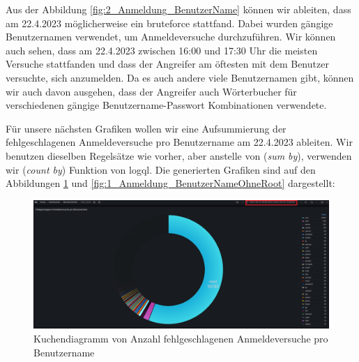 Aus der Abbildung \ref{fig:2_Anmeldung_BenutzerName} können wir ableiten, dass am 22.4.2023 möglicherweise ein \gls{bruteforce} stattfand. Dabei wurden gängige Benutzernamen verwendet, um Anmeldeversuche durchzuführen. Wir können auch sehen, dass am 22.4.2023 zwischen 16:00 und 17:30 Uhr die meisten Versuche stattfanden und dass der Angreifer am öftesten mit dem Benutzer  versuchte, sich anzumelden. Da es auch andere viele Benutzernamen gibt, können wir auch davon ausgehen, dass der Angreifer auch Wörterbucher für verschiedenen gängige Benutzername-Passwort Kombinationen verwendete.


Für unsere nächsten Grafiken wollen wir eine Aufsummierung der fehlgeschlagenen Anmeldeversuche pro Benutzername am 22.4.2023 ableiten. Wir benutzen dieselben Regelsätze wie vorher, aber anstelle von (\textit{sum by}), verwenden wir (\textit{count by}) Funktion von \gls{logql}. Die generierten Grafiken sind auf den Abbildungen \ref{fig:1_Anmeldung_BenutzerName} und \ref{fig:1_Anmeldung_BenutzerNameOhneRoot} dargestellt:

\newpage
{}
\thispagestyle{lscape}
\begin{landscape}
    \begin{figure}[H]
        \centerline{\includegraphics[width=1.7\textwidth]{assets/Failed_pro_user.png}}
        \caption[Kuchendiagramm von Anzahl fehlgeschlagenen Anmeldeversuche pro Benutzername]
        {Kuchendiagramm von Anzahl fehlgeschlagenen Anmeldeversuche pro Benutzername}
        \label{fig:1_Anmeldung_BenutzerName}
        \centering
    \end{figure}
\end{landscape}
\restoregeometry

